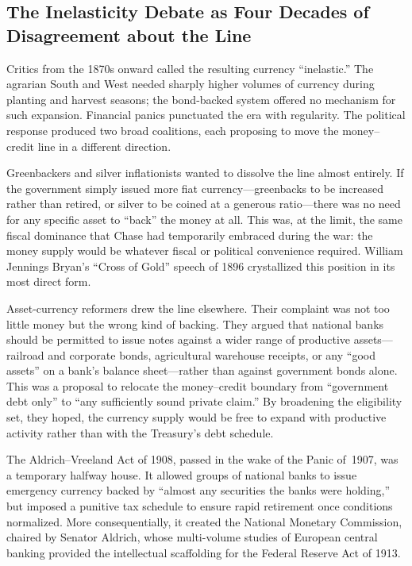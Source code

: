 \documentclass[12pt]{article}
\begin{document}
\subsection{The Inelasticity Debate as Four Decades of Disagreement
            about the Line}

Critics from the 1870s onward called the resulting currency
``inelastic.''  The agrarian South and West needed sharply higher
volumes of currency during planting and harvest seasons; the bond-backed
system offered no mechanism for such expansion.  Financial panics
punctuated the era with regularity.  The political response
produced two broad coalitions, each proposing to move the
money--credit line in a different direction.

Greenbackers and silver inflationists wanted to dissolve the
line almost entirely.  If the government simply issued more fiat
currency---greenbacks to be increased rather than retired, or silver to
be coined at a generous ratio---there was no need for any specific asset
to ``back'' the money at all.  This was, at the limit, the same fiscal
dominance that Chase had temporarily embraced during the war: the money
supply would be whatever fiscal or political convenience required.
William Jennings Bryan's ``Cross of Gold'' speech of 1896 crystallized
this position in its most direct form.

Asset-currency reformers drew the line elsewhere.  Their complaint was
not too little money but the wrong kind of backing.  They argued that
national banks should be permitted to issue notes against a wider range
of productive assets---railroad and corporate bonds, agricultural
warehouse receipts, or any ``good assets'' on a bank's balance
sheet---rather than against government bonds alone.  This was a proposal
to relocate the money--credit boundary from ``government debt only'' to
``any sufficiently sound private claim.''  By broadening the eligibility
set, they hoped, the currency supply would be free to expand with
productive activity rather than with the Treasury's debt schedule.

The Aldrich--Vreeland Act of 1908, passed in the wake of the Panic
of~1907, was a temporary halfway house.  It allowed groups of national
banks to issue emergency currency backed by ``almost any securities the
banks were holding,'' but imposed a punitive tax schedule to ensure
rapid retirement once conditions normalized.  More consequentially, it
created the National Monetary Commission, chaired by Senator Aldrich,
whose multi-volume studies of European central banking provided the
intellectual scaffolding for the Federal Reserve Act of 1913.
\end{document}
